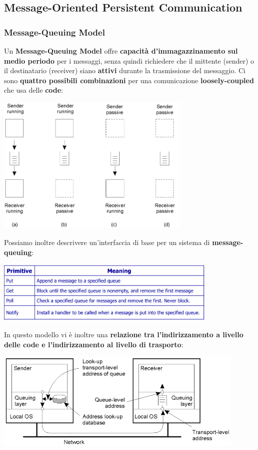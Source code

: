 \documentclass[12pt]{article}
\begin{document}
\subsection{Message-Oriented Persistent Communication}
\subsubsection{Message-Queuing Model}
Un \textbf{Message-Queuing Model} offre \textbf{capacità d'immagazzinamento sul medio periodo} per i messaggi, senza quindi richiedere che il mittente (sender) o il destinatario (receiver) siano \textbf{attivi} durante la trasmissione del messaggio. Ci sono \textbf{quattro possibili combinazioni} per una comunicazione \textbf{loosely-coupled} che usa delle \textbf{code}:
\begin{center}
    \includegraphics[width = 0.70\textwidth]{Images/137.PNG}
\end{center}
Possiamo inoltre descrivere un'interfaccia di base per un sistema di \textbf{message-queuing}:
\begin{center}
    \includegraphics[width = 0.80\textwidth]{Images/138.PNG}
\end{center}
In questo modello vi è inoltre una \textbf{relazione tra l'indirizzamento a livello delle code e l'indirizzamento al livello di trasporto}:
\begin{center}
    \includegraphics[width = 0.90\textwidth]{Images/139.PNG}
\end{center}
\end{document}
